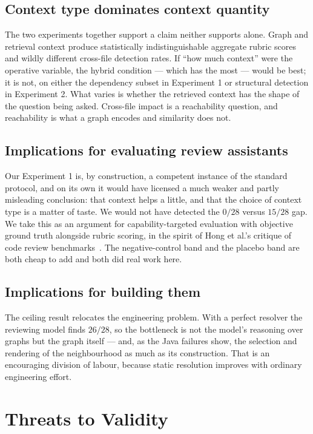 \documentclass[conference]{IEEEtran}
\begin{document}
\subsection{Context type dominates context quantity}
The two experiments together support a claim neither supports alone. Graph
and retrieval context produce statistically indistinguishable aggregate
rubric scores and wildly different cross-file detection rates. If ``how much
context'' were the operative variable, the hybrid condition --- which has the
most --- would be best; it is not, on either the dependency subset in
Experiment 1 or structural detection in Experiment 2. What varies is whether
the retrieved context has the shape of the question being asked. Cross-file
impact is a reachability question, and reachability is what a graph encodes
and similarity does not.

\subsection{Implications for evaluating review assistants}
Our Experiment 1 is, by construction, a competent instance of the standard
protocol, and on its own it would have licensed a much weaker and partly
misleading conclusion: that context helps a little, and that the choice of
context type is a matter of taste. We would not have detected the $0/28$
versus $15/28$ gap. We take this as an argument for capability-targeted
evaluation with objective ground truth alongside rubric scoring, in the
spirit of Hong et al.'s critique of code review
benchmarks~\cite{hong2024deepcrceval}. The negative-control band and the
placebo band are both cheap to add and both did real work here.

\subsection{Implications for building them}
The ceiling result relocates the engineering problem. With a perfect
resolver the reviewing model finds $26/28$, so the bottleneck is not the
model's reasoning over graphs but the graph itself --- and, as the Java
failures show, the selection and rendering of the neighbourhood as much as
its construction. That is an encouraging division of labour, because static
resolution improves with ordinary engineering effort.

\section{Threats to Validity}
\label{sec:threats}
\end{document}
